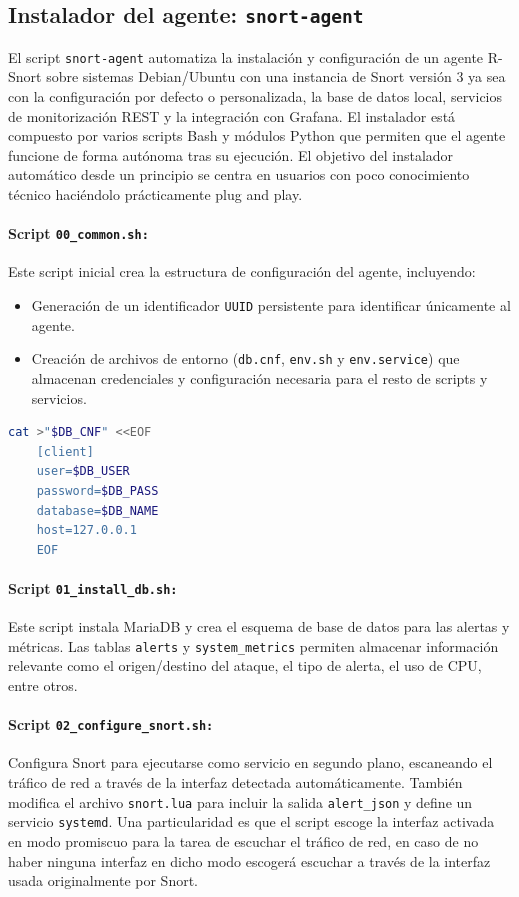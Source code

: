 \documentclass[11pt,a4paper,twoside]{report}
\begin{document}
\subsection{Instalador del agente: \texttt{snort-agent}}

El script \texttt{snort-agent} automatiza la instalación y configuración de un agente R-Snort sobre sistemas Debian/Ubuntu con una instancia de Snort versión 3 ya sea con la configuración por defecto o personalizada, la base de datos local, servicios de monitorización REST y la integración con Grafana. El instalador está compuesto por varios scripts Bash y módulos Python que permiten que el agente funcione de forma autónoma tras su ejecución. El objetivo del instalador automático desde un principio se centra en usuarios con poco conocimiento técnico haciéndolo prácticamente plug and play.

\paragraph{Script \texttt{00\_common.sh:}} Este script inicial crea la estructura de configuración del agente, incluyendo:

\begin{itemize}
	\item Generación de un identificador \texttt{UUID} persistente para identificar únicamente al agente.
	\item Creación de archivos de entorno (\texttt{db.cnf}, \texttt{env.sh} y \texttt{env.service}) que almacenan credenciales y configuración necesaria para el resto de scripts y servicios.
\end{itemize}

\begin{lstlisting}[language=bash, caption={Fragmento de creación del archivo db.cnf}]
	cat >"$DB_CNF" <<EOF
	[client]
	user=$DB_USER
	password=$DB_PASS
	database=$DB_NAME
	host=127.0.0.1
	EOF
\end{lstlisting}

\paragraph{Script \texttt{01\_install\_db.sh:}} Este script instala MariaDB y crea el esquema de base de datos para las alertas y métricas. Las tablas \texttt{alerts} y \texttt{system\_metrics} permiten almacenar información relevante como el origen/destino del ataque, el tipo de alerta, el uso de CPU, entre otros.

\paragraph{Script \texttt{02\_configure\_snort.sh:}} Configura Snort para ejecutarse como servicio en segundo plano, escaneando el tráfico de red a través de la interfaz detectada automáticamente. También modifica el archivo \texttt{snort.lua} para incluir la salida \texttt{alert\_json} y define un servicio \texttt{systemd}. Una particularidad es que el script escoge la interfaz activada en modo promiscuo para la tarea de escuchar el tráfico de red, en caso de no haber ninguna interfaz en dicho modo escogerá escuchar a través de la interfaz usada originalmente por Snort.
\end{document}
